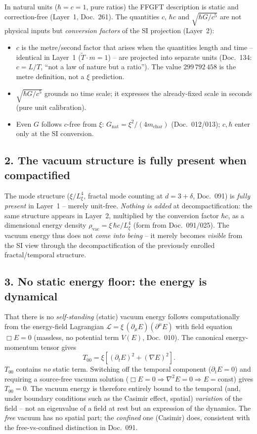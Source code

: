 In natural units ($\hbar=c=1$, pure ratios) the FFGFT description is static
and correction-free (Layer~1, Doc.~261). The quantities $c$, $\hbar c$ and
$\sqrt{\hbar G/c^5}$ are not physical inputs but \emph{conversion factors} of
the SI projection (Layer~2):
\begin{itemize}
  \item $c$ is the metre/second factor that arises when the quantities length
        and time -- identical in Layer~1 ($\tilde T\cdot m=1$) -- are projected
        into separate units (Doc.~134: $c=L/T$, \enquote{not a law of nature
        but a ratio}). The value $299\,792\,458$ is the metre definition, not a
        $\xi$ prediction.
  \item $\sqrt{\hbar G/c^5}$ grounds no time scale; it expresses the
        already-fixed scale in seconds (pure unit calibration).
  \item Even $G$ follows $c$-free from $\xi$: $G_{\text{nat}}=\xi^2/(4m_{\text{char}})$
        (Doc.~012/013); $c,\hbar$ enter only at the SI conversion.
\end{itemize}

\subsection*{2. The vacuum structure is fully present when compactified}

The mode structure ($\xi/L_\xi^4$, fractal mode counting at $d=3+\delta$,
Doc.~091) is \emph{fully present} in Layer~1 -- merely unit-free. \emph{Nothing
is added} at decompactification: the same structure appears in Layer~2,
multiplied by the conversion factor $\hbar c$, as a dimensional energy density
$\rho_{\text{vac}}=\xi\,\hbar c/L_\xi^4$ (form from Doc.~091/025). The vacuum
energy thus does not \emph{come into being} -- it merely becomes \emph{visible}
from the SI view through the decompactification of the previously enrolled
fractal/temporal structure.

\subsection*{3. No static energy floor: the energy is dynamical}

That there is no \emph{self-standing} (static) vacuum energy follows
computationally from the energy-field Lagrangian $\mathcal{L}=\xi\,(\partial_\mu
E)(\partial^\mu E)$ with field equation $\Box E=0$ (massless, no potential term
$V(E)$, Doc.~010). The canonical energy-momentum tensor gives
\[
  T_{00} = \xi\left[(\partial_t E)^2 + (\nabla E)^2\right].
\]
$T_{00}$ contains \emph{no} static term. Switching off the temporal component
($\partial_t E=0$) and requiring a source-free vacuum solution
($\Box E=0\Rightarrow\nabla^2 E=0\Rightarrow E=\text{const}$) gives
$T_{00}=0$. The vacuum energy is therefore entirely bound to the temporal
(and, under boundary conditions such as the Casimir effect, spatial)
\emph{variation} of the field -- not an eigenvalue of a field at rest but an
expression of the dynamics. The \emph{free} vacuum has no spatial part; the
\emph{confined} one (Casimir) does, consistent with the free-vs-confined
distinction in Doc.~091.

